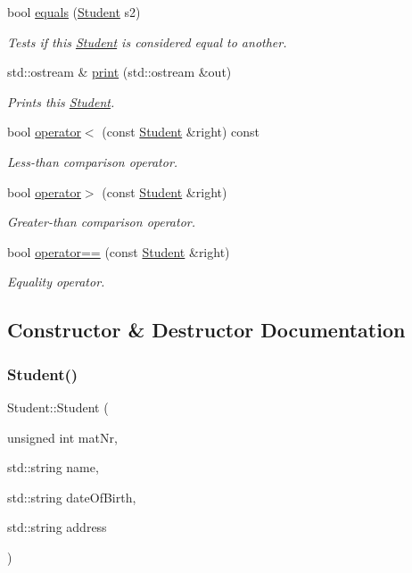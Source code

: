 \begin{DoxyCompactItemize}
bool \hyperlink{class_student_a2f03269568c42d5fb8e62f09ad2f493a}{equals} (\hyperlink{class_student}{Student} s2)
\begin{DoxyCompactList}\small\item\em Tests if this \hyperlink{class_student}{Student} is considered equal to another. \end{DoxyCompactList}\item 
std\+::ostream \& \hyperlink{class_student_a4fa6f3748a513137a8bb9728f579978c}{print} (std\+::ostream \&out)
\begin{DoxyCompactList}\small\item\em Prints this \hyperlink{class_student}{Student}. \end{DoxyCompactList}\item 
bool \hyperlink{class_student_a684c89e3452e2aee069029ede12a2519}{operator$<$} (const \hyperlink{class_student}{Student} \&right) const
\begin{DoxyCompactList}\small\item\em Less-\/than comparison operator. \end{DoxyCompactList}\item 
bool \hyperlink{class_student_af57a4b642e4afa314d1a3cdbccc7ff76}{operator$>$} (const \hyperlink{class_student}{Student} \&right)
\begin{DoxyCompactList}\small\item\em Greater-\/than comparison operator. \end{DoxyCompactList}\item 
bool \hyperlink{class_student_a424c5ab08bd852565b58c5a61f63d158}{operator==} (const \hyperlink{class_student}{Student} \&right)
\begin{DoxyCompactList}\small\item\em Equality operator. \end{DoxyCompactList}\end{DoxyCompactItemize}


\subsection{Constructor \& Destructor Documentation}
\mbox{\label{class_student_a6c25e4c1ba2564591573597a6c9ecca0}} 
\subsubsection{\texorpdfstring{Student()}{Student()}}
{\footnotesize\ttfamily Student\+::\+Student (\begin{DoxyParamCaption}\item[{unsigned int}]{mat\+Nr,  }\item[{std\+::string}]{name,  }\item[{std\+::string}]{date\+Of\+Birth,  }\item[{std\+::string}]{address }\end{DoxyParamCaption})}



